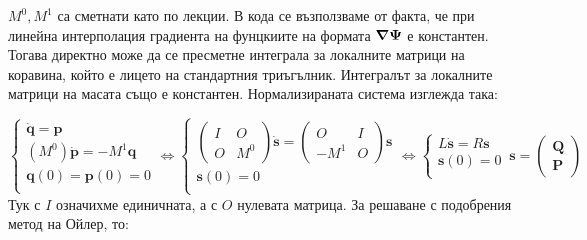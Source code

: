 \documentclass[bulgarian, 12pt]{article}
\begin{document}
\begin{large}
$M^0, M^1$ са сметнати като по лекции.
В кода се възползваме от факта, че при линейна интерполация градиента на фунцкиите на формата $\grad \boldsymbol{\Psi}$ е константен. 
Тогава директно може да се пресметне интеграла за локалните матрици на коравина, който е лицето на стандартния триъгълник.
Интегралът за локалните матрици на масата също е константен.
Нормализираната система изглежда така:
\begin{comment}
	\begin{cases}
		\dot{\mathbf{s}} = 
			\left(\begin{array}{c|c}
			O & I \\ \hline
			-(M^0)^{-1} M^1 & O
		\end{array}\right) \mathbf{s} = 
		A \mathbf{s}\\
		\mathbf{s}(0) = 0 \\
	\end{cases},
\end{comment}
\begin{equation*}
    \begin{cases}
      \dot {\mathbf{q}} = {\mathbf{p}} \\
      (M^0) \dot {\mathbf{p}} = -M^1 {\mathbf{q}} \\
      \mathbf{q}(0) = \mathbf{p}(0) = 0 \\
    \end{cases}
	\iff
	\begin{cases}
		\left(\begin{array}{c|c}
			I & O \\ \hline
			O & M^0
		\end{array}\right)\dot{\mathbf{s}} = 
			\left(\begin{array}{c|c}
			O & I \\ \hline
			-M^1 & O
		\end{array}\right) \mathbf{s} \\
		\mathbf{s}(0) = 0 \\
	\end{cases}\iff
	\begin{cases}
		L\dot{\mathbf{s}} = 
		R \mathbf{s} \\
		\mathbf{s}(0) = 0 \\
	\end{cases}\, 
	\mathbf{s} = 
		\left(\begin{array}{c}
			\mathbf{Q} \\ \hline
			\mathbf{P}
		\end{array}\right)
\end{equation*} 
Тук с $I$ означихме единичната, а с $O$ нулевата матрица. За решаване с подобрения метод на Ойлер, то:

\end{large}
\end{document}
